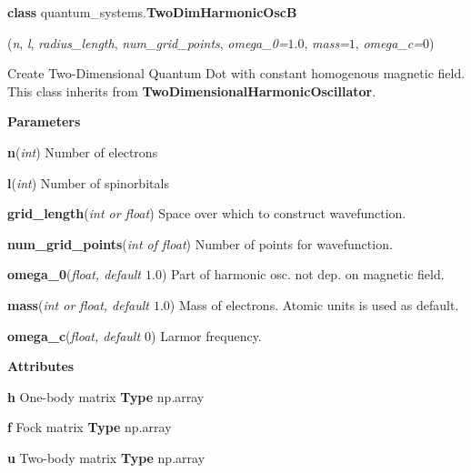 
\begin{tcolorbox}
    {\selectfont
    \textbf{class} quantum\_systems.\textbf{TwoDimHarmonicOscB}

    \hspace{1em}(\emph{n}, \emph{l}, \emph{radius\_length}, \emph{num\_grid\_points}, 
    \emph{omega\_0=$1.0$}, \emph{mass=$1$}, \emph{omega\_c=$0$})

    \vspace{1em}
    Create Two-Dimensional Quantum Dot with constant homogenous magnetic field.
    This class inherits from \textbf{TwoDimensionalHarmonicOscillator}.
    \vspace{1em}

    \textbf{Parameters}

    \hspace{2em}\textbf{n}(\emph{int}) Number of electrons
    
    \hspace{2em}\textbf{l}(\emph{int}) Number of spinorbitals
    
    \hspace{2em}\textbf{grid\_length}(\emph{int or float}) Space over which to 
        construct wavefunction.
    
    \hspace{2em}\textbf{num\_grid\_points}(\emph{int of float}) Number of 
        points for wavefunction.

    \hspace{2em}\textbf{omega\_0}(\emph{float, default $1.0$}) Part of harmonic 
        osc. not dep. on magnetic field. 
    
    \hspace{2em}\textbf{mass}(\emph{int or float, default $1.0$}) Mass of electrons.
        Atomic units is used as default.
    
    \hspace{2em}\textbf{omega\_c}(\emph{float, default $0$}) Larmor frequency.

    \vspace{1em}
    \textbf{Attributes}

    \hspace{2em} \textbf{h}
    One-body matrix 
    \textbf{Type} np.array
    
    \hspace{2em} \textbf{f}
    Fock matrix
    \textbf{Type} np.array

    \hspace{2em} \textbf{u}
    Two-body matrix
    \textbf{Type} np.array

}
\end{tcolorbox}

